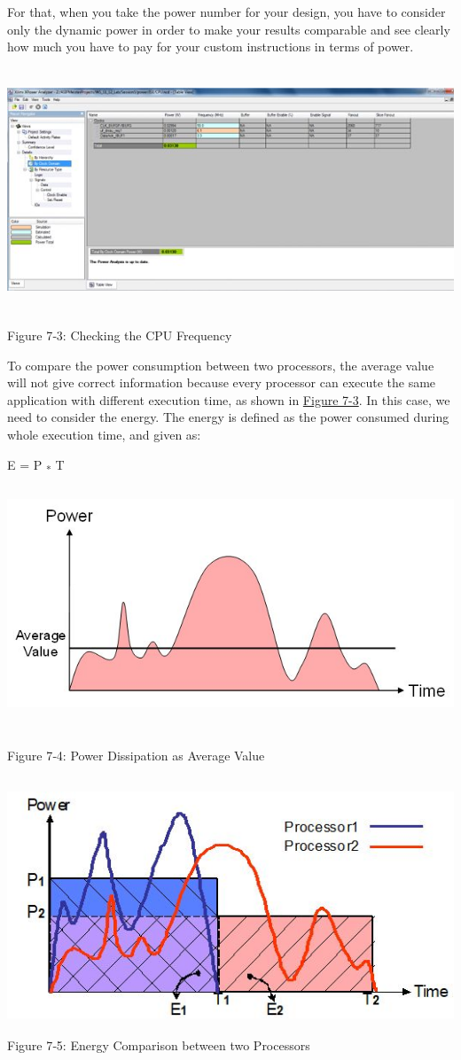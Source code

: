 \documentclass[
]{article}
\begin{document}
For that, when you take the power number for your design, you have to
consider only the dynamic power in order to make your results comparable
and see clearly how much you have to pay for your custom instructions in
terms of power.

\includegraphics[width=6.28333in,height=2.85069in]{7-3.png}

Figure 7‑3:\protect\hypertarget{Fig73}{}{} Checking the CPU Frequency

To compare the power consumption between two processors, the average
value will not give correct information because every processor can
execute the same application with different execution time, as shown in
\protect\hyperlink{Fig73}{Figure 7-3}. In this case, we need to consider
the energy. The energy is defined as the power consumed during whole
execution time, and given as:

E = P \textsubscript{*} T
\includegraphics[width=6.28333in,height=3in]{7-4.png}

Figure 7‑4: Power Dissipation as Average Value

\includegraphics[width=6.28333in,height=3in]{7-5.png}
Figure 7‑5: Energy Comparison between two Processors
\end{document}
